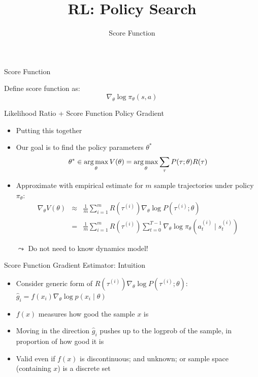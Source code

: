 \documentclass[aspectratio=169]{../latex_main/tntbeamer}  %
\title[RL: Score Function]{RL: Policy Search}
\subtitle{Score Function}
\begin{document}
	
	\maketitle

\begin{frame}[c]{Score Function}


Define score function as:
$$\nabla_\theta \log \pi_\theta (s,a) $$


\end{frame}
\begin{frame}[c]{Likelihood Ratio + Score Function Policy Gradient}
	
	\begin{itemize}
		\item Putting this together
		\item Our goal is to find the policy parameters $\theta^*$
		$$\theta^* \in \operatorname*{arg\,max}_{\theta} V(\theta) = \operatorname*{arg\,max}_{\theta}\sum_{\tau} P(\tau; \theta) R(\tau) $$
		\item Approximate with empirical estimate for $m$ sample trajectories under
		policy $\pi_\theta$:
		\begin{eqnarray}
		\nabla_\theta V(\theta) &\approx& \frac{1}{m} \sum_{i=1}^{m} R(\tau^{(i)}) \nabla_\theta \log P(\tau^{(i)}; \theta) \nonumber\\
		&=& \frac{1}{m} \sum_{i=1}^{m} R(\tau^{(i)}) \sum_{t=0}^{T-1} \nabla_\theta \log \pi_\theta (a_t^{(i)} \mid s_t^{(i)})
		\end{eqnarray}
		\item[$\leadsto$] Do not need to know dynamics model!
		
	\end{itemize}
	
\end{frame}
\begin{frame}[c]{Score Function Gradient Estimator: Intuition}
	
	\begin{itemize}
		\item Consider generic form of $R(\tau^{(i)}) \nabla_\theta \log P(\tau^{(i)}; \theta)$:\\
		$\hat{g}_i = f(x_i) \nabla_\theta \log p(x_i \mid \theta)$
		\item $f(x)$ measures how good the sample $x$ is
		\item Moving in the direction $\hat{g}_i$ pushes up to the logprob of the sample, in proportion of how good it is
		\item Valid even if $f(x)$ is discontinuous; and unknown; or sample space (containing $x$) is a discrete set
	\end{itemize}
	
\end{frame}
\end{document}
